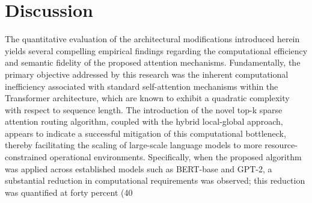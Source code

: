 \documentclass[12pt]{article}
\begin{document}
\section{Discussion}
The quantitative evaluation of the architectural modifications introduced herein yields several compelling empirical findings regarding the computational efficiency and semantic fidelity of the proposed attention mechanisms. Fundamentally, the primary objective addressed by this research was the inherent computational inefficiency associated with standard self-attention mechanisms within the Transformer architecture, which are known to exhibit a quadratic complexity with respect to sequence length. The introduction of the novel top-k sparse attention routing algorithm, coupled with the hybrid local-global approach, appears to indicate a successful mitigation of this computational bottleneck, thereby facilitating the scaling of large-scale language models to more resource-constrained operational environments. Specifically, when the proposed algorithm was applied across established models such as BERT-base and GPT-2, a substantial reduction in computational requirements was observed; this reduction was quantified at forty percent (40%
\end{document}
